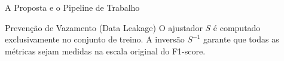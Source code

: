 \documentclass[aspectratio=169, 10pt]{beamer}
\begin{document}
\begin{frame}{A Proposta e o Pipeline de Trabalho}
{
  }
  \vspace{0.3cm}
  \begin{exampleblock}{Prevenção de Vazamento (Data Leakage)}
    O ajustador $S$ é computado exclusivamente no conjunto de treino. A inversão $S^{-1}$ garante que todas as métricas sejam medidas na escala original do F1-score.
  \end{exampleblock}
\end{frame}
\end{document}
